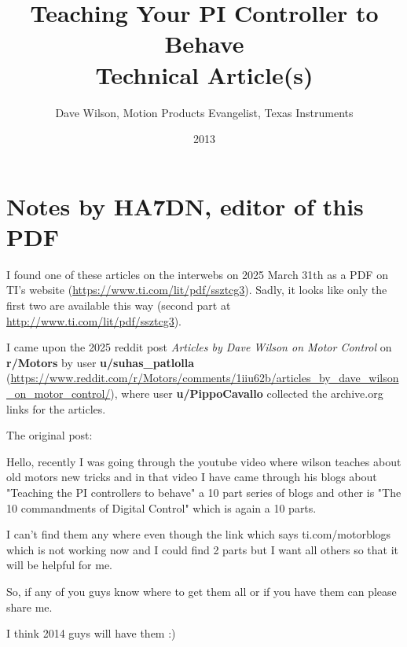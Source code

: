 \documentclass[11pt,a4paper]{report}
\title{Teaching Your PI Controller to Behave \\ \small Technical Article(s)}
\author{Dave Wilson, Motion Products Evangelist, Texas Instruments}
\date{2013}
\begin{document}
    \maketitle

    
    
    
    
    
    
    
    
    
    

    \chapter*{Notes by HA7DN, editor of this PDF}

    I found one of these articles on the interwebs on 2025 March 31th as a PDF on TI's website (\url{https://www.ti.com/lit/pdf/ssztcg3}). Sadly, it looks like only the first two are available this way (second part at \url{http://www.ti.com/lit/pdf/ssztcg3}).

    I came upon the 2025 reddit post \textit{Articles by Dave Wilson on Motor Control} on \textbf{r/Motors} by user \textbf{u/suhas\_patlolla} (\url{https://www.reddit.com/r/Motors/comments/1iiu62b/articles_by_dave_wilson_on_motor_control/}), where user \textbf{u/PippoCavallo} collected the archive.org links for the articles.

    The original post:
    \begin{displayquote}
        Hello, recently I was going through the youtube video where wilson teaches about old motors new tricks and in that video I have came through his blogs about "Teaching the PI controllers to behave" a 10 part series of blogs and other is "The 10 commandments of Digital Control" which is again a 10 parts.

        I can't find them any where even though the link which says ti.com/motorblogs which is not working now and I could find 2 parts but I want all others so that it will be helpful for me.

        So, if any of you guys know where to get them all or if you have them can please share me.

        I think 2014 guys will have them :)
    \end{displayquote}
\end{document}

